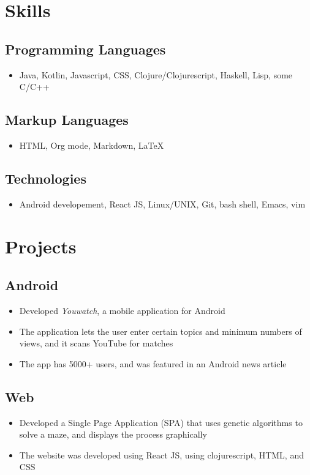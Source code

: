 \documentclass[12pt, noindent]{article}
\begin{document}
\section{Skills}
\subsection{Programming Languages}
\begin{itemize}
\item Java, Kotlin, Javascript, CSS, Clojure/Clojurescript, Haskell, Lisp,
  some C/C++
\end{itemize}

\subsection{Markup Languages}
\begin{itemize}
\item HTML, Org mode, Markdown, \LaTeX{}
\end{itemize}

\subsection{Technologies}
\begin{itemize}
\item Android developement, React JS, Linux/UNIX, Git, bash shell, Emacs, vim
\end{itemize}

\section{Projects}
\subsection{Android}
\begin{itemize}
  \itemsep-.25em
\item Developed \textit{Youwatch}, a mobile application for Android
\item The application lets the user enter certain topics and minimum numbers of
  views, and it scans YouTube for matches
\item The app has 5000+ users, and was featured in an Android news article 
\end{itemize}

\subsection{Web}
\begin{itemize}
  \itemsep-.25em
\item Developed a Single Page Application (SPA) that uses genetic algorithms to
  solve a maze, and displays the process graphically
\item The website was developed using React JS, using clojurescript, HTML, and
  CSS
\end{itemize}
\end{document}
